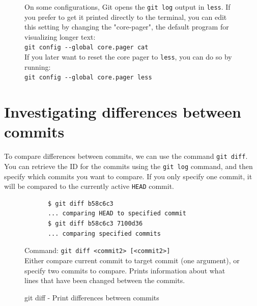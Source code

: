 \documentclass[../main/git_course_main.tex]{subfiles}
\begin{document}
	\begin{figure}[h!]
		\begin{redbox}
			On some configurations, Git opens the \verb$git log$ output in \verb$less$. If you prefer to get it printed directly to the terminal, you can edit this setting by changing the "core-pager", the default program for visualizing longer text: \\
			
			\verb$git config --global core.pager cat$ \\
			
			If you later want to reset the core pager to \verb$less$, you can do so by running: \\
			
			\verb$git config --global core.pager less$
		\end{redbox}
	\end{figure}
	
	\section{Investigating differences between commits}
	
	To compare differences between commits, we can use the command \verb$git diff$.
	You can retrieve the ID for the commits using the \verb$git log$ command, and then
	specify which commits you want to compare. If you only specify one commit, it will
	be compared to the currently active \verb$HEAD$ commit.
	
	\begin{codebox}
		\begin{lstlisting}
			$ git diff b58c6c3
			... comparing HEAD to specified commit
			$ git diff b58c6c3 7100d36
			... comparing specified commits
		\end{lstlisting}
	\end{codebox}
	
	\begin{figure}[h!]
		\begin{bluebox}
			Command: \verb$git diff <commit2> [<commit2>]$ \\
			
			Either compare current commit to target commit (one argument), or
			specify two commits to compare. Prints information about what lines
			that have been changed between the commits.
		\end{bluebox}
		\label{command:diff}
		\caption{git diff - Print differences between commits}
	\end{figure}
	
\end{document}
